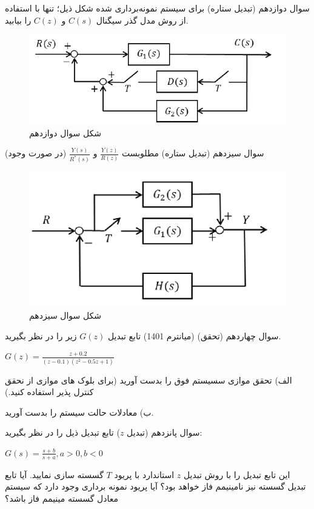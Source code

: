 \documentclass{article}
\begin{document}
\begin{problem}{سوال دوازدهم}
	(تبدیل ستاره) برای سیستم نمونه‌برداری شده شکل ذیل؛ تنها با استفاده از روش مدل گذر سیگنال 
	$C(s)$
	و
	$C(z)$
	را بیابید.

\end{problem}
\begin{figure}
	\includegraphics[width=\linewidth]{Second Series/6.png}
	\caption{شکل سوال دوازدهم}
\end{figure}


\begin{problem}{سوال سیزدهم}
	(تبدیل ستاره) مطلوبست
	$\frac{Y(z)}{R(z)}$
	و
	$\frac{Y(s)}{R^*(s)}$
	(در صورت وجود)
	
	
\end{problem}
\begin{figure}
	\includegraphics[width=\linewidth]{Second Series/7.png}
	\caption{شکل سوال سیزدهم}
\end{figure}

\begin{problem}{سوال چهاردهم}
	(تحقق) (میانترم 1401) تابع تبدیل $G(z)$ زیر را در نظر بگیرید.
	
	\centering
	$G(z) = \frac{z + 0.2}{(z-0.1)(z^2-0.5z+1)}$
	
	\raggedright
	الف) تحقق موازی سسیستم فوق را بدست آورید (برای بلوک های موازی از نحقق کنترل پذیر استفاده کنید.)
	
	ب) معادلات حالت سیستم را بدست آورید.
	
\end{problem}


\begin{problem}{سوال پانزدهم}
	(تبدیل $z$) تابع تبدیل ذیل را در نظر بگیرید: 
	
	\centering
	$G(s) = \frac{s+b}{s+a} , a > 0 , b <0$ 
	
	\raggedright
	این تابع تبدیل را با روش تبدیل $z$ استاندارد با پریود $T$ گسسته سازی نمایید. آیا تابع تبدیل گسسته نیز نامینیمم فاز خواهد بود؟ آیا
	پریود نمونه برداری وجود دارد که سیستم معادل گسسته مینیمم فاز باشد؟
\end{problem}
\end{document}
